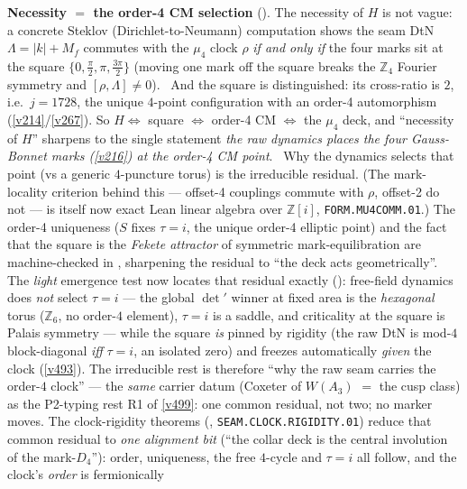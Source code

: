 \documentclass[11pt,a4paper]{article}
\newcommand{\Z}{\mathbb Z}
\begin{document}
\par\smallskip\noindent\textbf{Necessity $=$ the order-4 CM selection}
(). The necessity of $H$ is not vague: a concrete Steklov (Dirichlet-to-Neumann)
computation shows the seam DtN $\Lambda{=}|k|{+}M_f$ commutes with the $\mu_4$ clock $\rho$ \emph{if and only if}
the four marks sit at the square $\{0,\tfrac\pi2,\pi,\tfrac{3\pi}2\}$ (moving one mark off the square breaks the
$\Z_4$ Fourier symmetry and $[\rho,\Lambda]\neq0$). \mE\ And the square is distinguished: its cross-ratio is $2$,
i.e.\ $j{=}1728$, the unique $4$-point configuration with an order-4 automorphism (\vref{v214}/\vref{v267}). So
$H\Leftrightarrow$ square $\Leftrightarrow$ order-4 CM $\Leftrightarrow$ the $\mu_4$ deck, and ``necessity of $H$''
sharpens to the single statement \emph{the raw dynamics places the four Gauss-Bonnet marks (\vref{v216}) at the
order-4 CM point}. \mO\ Why the dynamics selects that point (vs a generic $4$-puncture torus) is the irreducible
residual. (The mark-locality criterion behind this --- offset-4 couplings commute with $\rho$, offset-2 do not ---
is itself now exact Lean linear algebra over $\Z[i]$, \texttt{FORM.MU4COMM.01}.) The order-4 uniqueness ($S$ fixes
$\tau{=}i$, the unique order-4 elliptic point) and the fact that the square is the \emph{Fekete attractor} of
symmetric mark-equilibration are machine-checked in , sharpening the residual to ``the
deck acts geometrically''. The \emph{light} emergence test now locates that residual exactly
(): free-field dynamics does \emph{not} select $\tau=i$ --- the global
$\det{}'$ winner at fixed area is the \emph{hexagonal} torus ($\Z_6$, no order-$4$ element), $\tau=i$ is a saddle,
and criticality at the square is Palais symmetry --- while the square \emph{is} pinned by rigidity (the raw DtN is
mod-$4$ block-diagonal \emph{iff} $\tau=i$, an isolated zero) and freezes automatically \emph{given} the clock
(\vref{v493}). The irreducible rest is therefore ``why the raw seam carries the order-$4$ clock'' --- the
\emph{same} carrier datum (Coxeter of $W(A_3)$ $=$ the cusp class) as the P2-typing rest R1 of \vref{v499}: one
common residual, not two; no marker moves. The clock-rigidity theorems
(, \texttt{SEAM.CLOCK.RIGIDITY.01}) reduce that common residual to
\emph{one alignment bit} (``the collar deck is the central involution of the mark-$D_4$''): order,
uniqueness, the free $4$-cycle and $\tau=i$ all follow, and the clock's \emph{order} is fermionically
\end{document}
